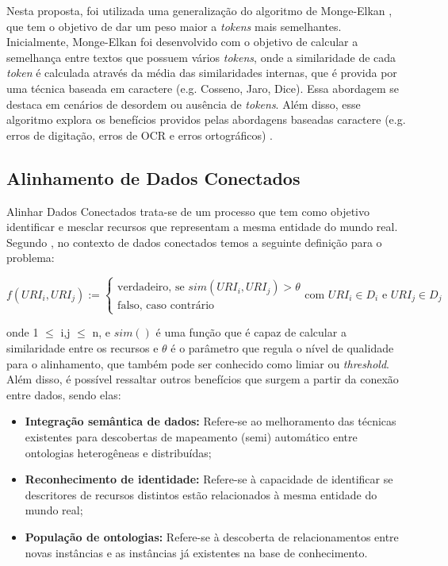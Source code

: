 Nesta proposta, foi utilizada uma generalização do algoritmo de Monge-Elkan \cite{monge1996field}, que tem o objetivo de dar um peso maior a \textit{tokens} mais semelhantes. Inicialmente, Monge-Elkan foi desenvolvido com o objetivo de calcular a semelhança entre textos que possuem vários \textit{tokens}, onde a similaridade de cada \textit{token} é calculada através da média das similaridades internas, que é provida por uma técnica baseada em caractere (e.g. Cosseno, Jaro, Dice). Essa abordagem se destaca em cenários de desordem ou ausência de \textit{tokens}. Além disso, esse algoritmo explora os benefícios providos pelas abordagens baseadas caractere (e.g. erros de digitação, erros de OCR e erros ortográficos) \cite{jimenez2009generalized}.

\subsection{Alinhamento de Dados Conectados}

Alinhar Dados Conectados  trata-se de um processo que tem como objetivo identificar e mesclar recursos que representam a mesma entidade do mundo real. Segundo , no contexto de dados conectados temos a seguinte definição para o problema:

\begin{equation}
f\left( { URI }_{ i },{ URI }_{ j } \right) :=\begin{cases} \mbox{verdadeiro, se } sim\left( { URI }_{ i },{ URI }_{ j } \right) >\theta  \\ \mbox{falso, caso contrário} \end{cases}\mbox{com }{ URI }_{ i } \in { D }_{ i }\mbox{ e }{ URI }_{ j } \in { D }_{ j }
\end{equation}

onde 1 $\leq$ i,j $\leq$ n, e $sim()$ é uma função que é capaz de calcular a similaridade entre os recursos e $\theta$ é o parâmetro que regula o nível de qualidade para o alinhamento, que também pode ser conhecido como limiar ou \textit{threshold}. Além disso, é possível ressaltar outros benefícios que surgem a partir da conexão entre dados, sendo elas: 

\begin{itemize}
	\item \textbf{Integração semântica de dados:} Refere-se ao melhoramento das técnicas existentes para descobertas de mapeamento (semi) automático entre ontologias heterogêneas e distribuídas; 
	\item \textbf{Reconhecimento de identidade:} Refere-se à capacidade de identificar se descritores de recursos distintos estão relacionados à mesma entidade do mundo real; 
	\item\textbf{ População de ontologias:} Refere-se à descoberta de relacionamentos entre novas instâncias e as instâncias já existentes na base de conhecimento. 
\end{itemize}

